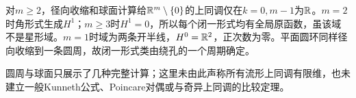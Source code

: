 \begin{example}[穿孔空间与环域的结果]
对$m\geq2$，径向收缩和球面计算给$\mathbb{R}^m\setminus\{0\}$的上同调仅在$k=0,m-1$为$\mathbb{R}$。$m=2$时角形式生成$H^1$；$m\geq3$时$H^1=0$，所以每个闭一形式均有全局原函数，虽该域不是星形域。$m=1$时域为两条开半线，$H^0=\mathbb{R}^2$，正次数为零。平面圆环同样径向收缩到一条圆周，故闭一形式类由绕孔的一个周期确定。
\end{example}
圆周与球面只展示了几种完整计算；这里未由此声称所有流形上同调有限维，也未建立一般Kunneth公式、Poincare对偶或与奇异上同调的比较定理。
